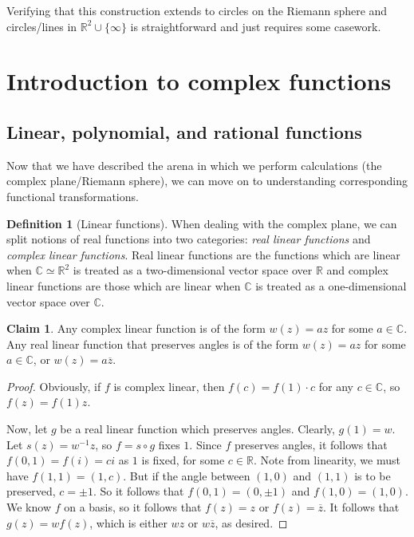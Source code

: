 \documentclass[aps,pra,showpacs,notitlepage,onecolumn,superscriptaddress,nofootinbib]{revtex4-1}
\theoremstyle{definition}
\newtheorem{definition}{Definition}[section]
\newtheorem{claim}{Claim}[section]
\begin{document}
Verifying that this construction extends to circles on the Riemann sphere and circles/lines in $\mathbb{R}^2 \cup \{\infty\}$ is straightforward and just requires some casework.

\section{Introduction to complex functions}

\subsection{Linear, polynomial, and rational functions}

\noindent Now that we have described the arena in which we perform calculations (the complex plane/Riemann sphere), we can move on to understanding corresponding functional transformations.

\begin{definition}[Linear functions]
  When dealing with the complex plane, we can split notions of real functions into two categories: \emph{real linear functions} and \emph{complex linear functions}. Real linear functions
  are the functions which are linear when $\mathbb{C} \simeq \mathbb{R}^2$ is treated as a two-dimensional vector space over $\mathbb{R}$ and complex linear functions are those which are linear
  when $\mathbb{C}$ is treated as a one-dimensional vector space over $\mathbb{C}$.
\end{definition}

\begin{claim}
  Any complex linear function is of the form $w(z) = az$ for some $a \in \mathbb{C}$. Any real linear function that preserves angles is of the form $w(z) = az$ for some $a \in \mathbb{C}$, or $w(z) = a\overline{z}$.
\end{claim}

\begin{proof}
  Obviously, if $f$ is complex linear, then $f(c) = f(1) \cdot c$ for any $c \in \mathbb{C}$, so $f(z) = f(1) z$.
  \newline

  \noindent Now, let $g$ be a real linear function which preserves angles. Clearly, $g(1) = w$. Let $s(z) = w^{-1} z$, so $f = s \circ g$ fixes $1$. Since $f$ preserves angles, it follows that $f(0, 1) = f(i) = c i$ as $1$ is fixed, for some $c \in \mathbb{R}$.
  Note from linearity, we must have $f(1, 1) = (1, c)$. But if the angle between $(1, 0)$ and $(1, 1)$ is to be preserved, $c = \pm 1$. So it follows that $f(0, 1) = (0, \pm 1)$ and $f(1, 0) = (1, 0)$. We know $f$ on a basis,
  so it follows that $f(z) = z$ or $f(z) = \overline{z}$. It follows that $g(z) = w f(z)$, which is either $wz$ or $w \overline{z}$, as desired.
\end{proof}
\end{document}
